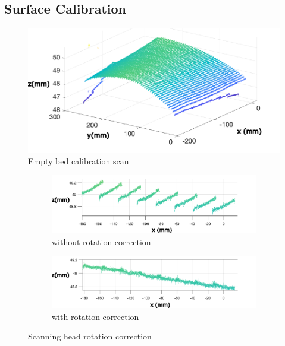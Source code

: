 \documentclass[12pt]{report}
\begin{document}
\subsection{Surface Calibration}
\begin{figure}
    \centering
    \includegraphics{figures/profile_measure/calib_surf.pdf}
    \caption{Empty bed calibration scan}
    \label{fig:empty_calib}
\end{figure}
\begin{figure}[ht]
    \begin{subfigure}{\textwidth}
        \centering
        \includegraphics[width=\linewidth]{figures/profile_measure/uncalib_line.pdf}  
        \caption{without rotation correction}
        \label{fig:uncalib_line}
    \end{subfigure}
    \newline
    \begin{subfigure}{\textwidth}
        \centering
        \includegraphics[width=\linewidth]{figures/profile_measure/calib_line.pdf}  
        \caption{with rotation correction}
        \label{fig:calib_line}
    \end{subfigure}
    \caption{Scanning head rotation correction}
    \label{fig:rot_correction}
\end{figure}
\end{document}
